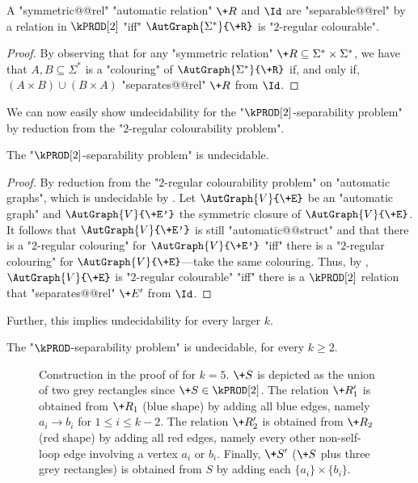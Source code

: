 \begin{corollary}\AP\label{cor:2reg-2prod}
    A "symmetric@@rel" "automatic relation" $\+R$ and $\Id$ are "separable@@rel" by a relation in $\kPROD[2]$ "iff" $\AutGraph{\Sigma^*}{\+R}$ is "$2$-regular colourable".
\end{corollary}

\begin{proof}
    By observing that for any "symmetric relation" $\+R \subseteq \Sigma^* \times \Sigma^*$, we have that $A,B \subseteq \Sigma^*$ is a "colouring" of $\AutGraph{\Sigma^*}{\+R}$ if, and only if, $(A \times B) \cup (B \times A)$ "separates@@rel" $\+R$ from $\Id$.
\end{proof}

We can now easily show undecidability for the "$\kPROD[2]$-separability problem" by reduction from the "$2$-regular colourability problem".
\begin{lemma}\AP\label{lem:aut-2prod-sep-undec}
    The "$\kPROD[2]$-separability problem" is undecidable.
\end{lemma}
\begin{proof}
    By reduction from the "$2$-regular colourability problem" on "automatic graphs", which is undecidable by . Let $\AutGraph{V}{\+E}$ be an "automatic graph" and $\AutGraph{V}{\+E'}$ the symmetric closure of $\AutGraph{V}{\+E}$. It follows that $\AutGraph{V}{\+E'}$ is still "automatic@@struct" and that there is a "$2$-regular colouring" for $\AutGraph{V}{\+E'}$ "iff" there is a "$2$-regular colouring" for $\AutGraph{V}{\+E}$---take the same colouring.
    Thus, by , $\AutGraph{V}{\+E}$ is "$2$-regular colourable" "iff" 
    there is a $\kPROD[2]$ relation that "separates@@rel" $\+E'$ from $\Id$.
\end{proof}

Further, this implies undecidability for every larger $k$.
\begin{proposition}
    \AP\label{prop:kprod-undecidable}
    The "$\kPROD$-separability problem" is undecidable, for every $k \geq 2$.
\end{proposition}

\begin{figure}
    \centering
    \begin{tikzpicture}
        
    \end{tikzpicture}
    \caption{
        \AP\label{fig:2prod-to-kprod}
        Construction in the proof of  for $k = 5$. $\+S$ is depicted as the union of two grey rectangles since $\+S \in \kPROD[2]$.
        The relation $\+R'_1$ is obtained from $\+R_1$ (blue shape) by adding all blue edges,
        namely $a_i \to b_i$ for $1\leq i \leq k-2$. The relation $\+R'_2$ is obtained from $\+R_2$ (red shape) by adding
        all red edges, namely every other non-self-loop edge involving a vertex $a_i$ or $b_i$.
        Finally, $\+S'$ ($\+S$ plus three grey rectangles) is obtained from $S$ by adding
        each $\{a_i\} \times \{b_i\}$.
    }
\end{figure}

